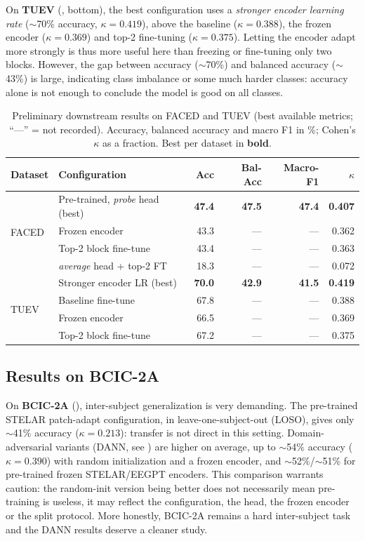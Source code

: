\documentclass[11pt]{article}
\begin{document}
On \textbf{TUEV} (, bottom), the best configuration uses a
\emph{stronger encoder learning rate} ($\sim$70\% accuracy, $\kappa=0.419$), above
the baseline ($\kappa=0.388$), the frozen encoder ($\kappa=0.369$) and top-2
fine-tuning ($\kappa=0.375$). Letting the encoder adapt more strongly is thus more
useful here than freezing or fine-tuning only two blocks. However, the gap between
accuracy ($\sim$70\%) and balanced accuracy ($\sim$43\%) is large, indicating
class imbalance or some much harder classes: accuracy alone is not enough to
conclude the model is good on all classes.

\begin{table}[t]
\centering
\caption{Preliminary downstream results on FACED and TUEV (best available
metrics; ``---'' = not recorded). Accuracy, balanced accuracy and macro F1 in \%;
Cohen's $\kappa$ as a fraction. Best per dataset in \textbf{bold}.}
\label{tab:faced-tuev}
\small
\begin{tabular}{llrrrr}
\toprule
Dataset & Configuration & Acc & Bal-Acc & Macro-F1 & $\kappa$ \\
\midrule
\multirow{4}{*}{FACED}
 & Pre-trained, \emph{probe} head (best) & \textbf{47.4} & \textbf{47.5} & \textbf{47.4} & \textbf{0.407} \\
 & Frozen encoder                 & 43.3 & --- & --- & 0.362 \\
 & Top-2 block fine-tune          & 43.4 & --- & --- & 0.363 \\
 & \emph{average} head + top-2 FT  & 18.3 & --- & --- & 0.072 \\
\midrule
\multirow{4}{*}{TUEV}
 & Stronger encoder LR (best)     & \textbf{70.0} & \textbf{42.9} & \textbf{41.5} & \textbf{0.419} \\
 & Baseline fine-tune             & 67.8 & --- & --- & 0.388 \\
 & Frozen encoder                 & 66.5 & --- & --- & 0.369 \\
 & Top-2 block fine-tune          & 67.2 & --- & --- & 0.375 \\
\bottomrule
\end{tabular}
\end{table}

\subsection{Results on BCIC-2A}
On \textbf{BCIC-2A} (), inter-subject generalization is very
demanding. The pre-trained STELAR patch-adapt configuration, in
leave-one-subject-out (LOSO), gives only $\sim$41\% accuracy ($\kappa=0.213$):
transfer is not direct in this setting. Domain-adversarial variants (DANN, see
) are higher on average, up to $\sim$54\% accuracy
($\kappa=0.390$) with random initialization and a frozen encoder, and
$\sim$52\%/$\sim$51\% for pre-trained frozen STELAR/EEGPT encoders. This
comparison warrants caution: the random-init version being better does not
necessarily mean pre-training is useless, it may reflect the configuration, the
head, the frozen encoder or the split protocol. More honestly, BCIC-2A remains a
hard inter-subject task and the DANN results deserve a cleaner study.
\end{document}
